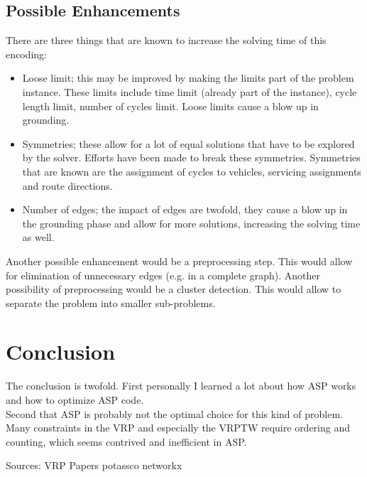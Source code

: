 \documentclass[12pt, letterpaper]{article}
\begin{document}
\subsection{Possible Enhancements}
There are three things that are known to increase the solving time of this encoding:
\begin{itemize}
	\item Loose limit; this may be improved by making the limits part of the problem instance. These limits include time limit (already part of the instance), cycle length limit, number of cycles limit. Loose limits cause a blow up in grounding.
	\item Symmetries; these allow for a lot of equal solutions that have to be explored by the solver. Efforts have been made to break these symmetries. Symmetries that are known are the assignment of cycles to vehicles, servicing assignments and route directions.
	\item Number of edges; the impact of edges are twofold, they cause a blow up in the grounding phase and allow for more solutions, increasing the solving time as well.
\end{itemize}

Another possible enhancement would be a preprocessing step. This would allow for elimination of unnecessary edges (e.g. in a complete graph). Another possibility of preprocessing would be a cluster detection. This would allow to separate the problem into smaller sub-problems.

\section{Conclusion}
The conclusion is twofold. First personally I learned a lot about how ASP works and how to optimize ASP code.\\
Second that ASP is probably not the optimal choice for this kind of problem. Many constraints in the VRP and especially the VRPTW require ordering and counting, which seems contrived and inefficient in ASP.

Sources:
VRP Papers
potassco
networkx
\end{document}
